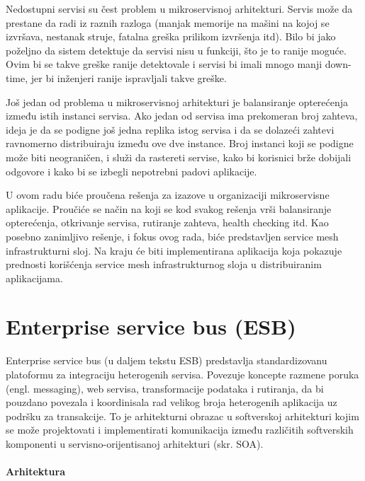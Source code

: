 \documentclass[a4paper,12pt]{report}
\begin{document}
Nedostupni servisi su čest problem u mikroservisnoj arhitekturi. Servis može da prestane da radi iz raznih razloga (manjak memorije na mašini na kojoj se izvršava, nestanak struje, fatalna greška prilikom izvršenja itd). Bilo bi jako poželjno da sistem detektuje da servisi nisu u funkciji, što je to ranije moguće. Ovim bi se takve greške ranije detektovale i servisi bi imali mnogo manji down-time, jer bi inženjeri ranije ispravljali takve greške. \newline

Još jedan od problema u mikroservisnoj arhitekturi je balansiranje opterećenja između istih instanci servisa. Ako jedan od servisa ima prekomeran broj zahteva, ideja je da se podigne još jedna replika istog servisa i da se dolazeći zahtevi ravnomerno distribuiraju između ove dve instance. Broj instanci koji se podigne može biti neograničen, i služi da rastereti servise, kako bi korisnici brže dobijali odgovore i kako bi se izbegli nepotrebni padovi aplikacije. \newline 

U ovom radu biće proučena rešenja za izazove u organizaciji mikroservisne aplikacije. Proučiće se način na koji se kod svakog rešenja vrši balansiranje opterećenja, otkrivanje servisa, rutiranje zahteva, health checking itd. Kao posebno zanimljivo rešenje, i fokus ovog rada, biće predstavljen service mesh infrastrukturni sloj. Na kraju će biti implementirana aplikacija koja pokazuje prednosti korišćenja service mesh infrastrukturnog sloja u distribuiranim aplikacijama. \newline 

\chapter{Enterprise service bus (ESB)}

Enterprise service bus (u daljem tekstu ESB) predstavlja standardizovanu platoformu za integraciju heterogenih servisa. Povezuje koncepte razmene poruka (engl. messaging), web servisa, transformacije podataka i rutiranja, da bi pouzdano povezala i koordinisala rad velikog broja heterogenih aplikacija uz podršku za transakcije. To je arhitekturni obrazac u softverskoj arhitekturi kojim se može projektovati i implementirati komunikacija između različitih softverskih komponenti u servisno-orijentisanoj arhitekturi (skr. SOA).\newline

\subsubsection{Arhitektura}
\end{document}
